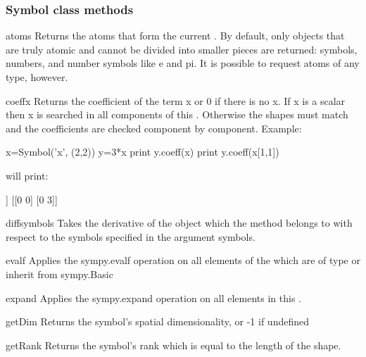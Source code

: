 \subsubsection{Symbol class methods}
\begin{methoddesc}[Symbol]{atoms}{}
Returns the atoms that form the current \SYMBOL.
By default, only objects that are truly atomic and cannot be divided
into smaller pieces are returned: symbols, numbers, and number
symbols like e and pi. It is possible to request atoms of any type,
however.
\end{methoddesc}

\begin{methoddesc}[Symbol]{coeff}{x }
Returns the coefficient of the term x or 0 if there is no x.
If x is a scalar \SYMBOL then x is searched in all components of
this \SYMBOL. Otherwise the shapes must match and the coefficients are
checked component by component.
Example:
\begin{python}
     x=Symbol('x', (2,2))
     y=3*x
     print y.coeff(x)
     print y.coeff(x[1,1])
\end{python}
will print:
\begin{python}
     [[3 3]
      [3 3]]
     [[0 0]
      [0 3]]
\end{python} 
\end{methoddesc}
\begin{methoddesc}[Symbol]{diff}{symbols}
Takes the derivative of the \SYMBOL object which the method belongs to with respect to the symbols specified in the argument symbols.
\end{methoddesc}
\begin{methoddesc}[Symbol]{evalf}{}
Applies the sympy.evalf operation on all elements of the \SYMBOL which are of type or inherit from sympy.Basic 
\end{methoddesc}
\begin{methoddesc}[Symbol]{expand}{}
Applies the sympy.expand operation on all elements in this \SYMBOL.
\end{methoddesc}
\begin{methoddesc}[Symbol]{getDim}{}
Returns the symbol's spatial dimensionality, or -1 if undefined
\end{methoddesc}
\begin{methoddesc}[Symbol]{getRank}{}
Returns the symbol's rank which is equal to the length of the shape.
\end{methoddesc}
